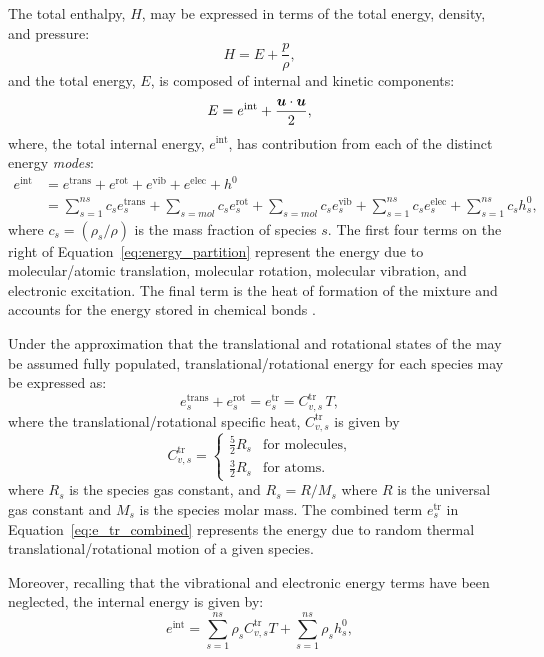 \documentclass[10pt]{article}
\newcommand{\bv}[1]{\ensuremath{\mbox{\boldmath$ #1 $}}}
\begin{document}
The total enthalpy, $H$, may be expressed in terms of the total energy, density, and pressure:
$$H = E + \dfrac{p}{\rho},$$
and the total energy, $E$, is composed of internal and kinetic components: $$E = e^{\text{int}} + \dfrac{\bv{u}\cdot\bv{u}}{2},$$
where, the total internal energy, $e^{\text{int}}$, has contribution from each of the distinct energy \emph{modes}:%
\begin{align}
 e^{\text{int}} &= e^{\text{trans}} + e^{\text{rot}} + e^{\text{vib}} + e^{\text{elec}} + h^0 \\
 &= \sum_{s=1}^{ns} c_s e^{\text{trans}}_s + \sum_{s=mol} c_s e^{\text{rot}}_s + \sum_{s=mol} c_s e^{\text{vib}}_s + \sum_{s=1}^{ns} c_s e^{\text{elec}}_s + \sum_{s=1}^{ns} c_s h^0_s ,
\label{eq:energy_partition}
\end{align}
where $c_s=\left(\rho_s/\rho\right)$ is the mass fraction of species $s$. 
The first four terms on the right of Equation~\eqref{eq:energy_partition} represent the energy due to molecular/atomic translation, molecular rotation, molecular vibration, and electronic excitation. The final term is the heat of formation of the mixture and accounts for the energy stored in chemical bonds \citep{Ait1996,Kirk2009}.

Under the approximation that the translational and rotational states of the may be assumed fully populated, translational/rotational energy for each species may be expressed as:
\begin{equation}
 \label{eq:e_tr_combined}
 e^{\text{trans}}_s + e^{\text{rot}}_s = e^{\text{tr}}_s = C^{\text{tr}}_{v,s}\, T ,
\end{equation}
where the translational/rotational specific heat, $C^{\text{tr}}_{v,s}$ is given by
\begin{equation}
 C^{\text{tr}}_{v,s} =
 \begin{cases}
 \frac{5}{2} R_s & \text{for molecules}, \\
 \frac{3}{2} R_s & \text{for atoms.}
 \end{cases}
\end{equation}
where $R_s$ is the species gas constant, and $R_s = R/M_s$ where $R$ is the universal gas constant and $M_s$ is the species molar mass. The combined term $e^{\text{tr}}_s$ in Equation~\eqref{eq:e_tr_combined} represents the energy due to random thermal translational/rotational motion of a given species.

Moreover, recalling that the vibrational and electronic energy terms have been neglected, the internal energy is given by:
\begin{equation}
 \label{eq:rE-T-Tv-relationship}
 e^{\text{int}} = \sum_{s=1}^{ns} \rho_s C^{\text{tr}}_{v,s} T + \sum_{s=1}^{ns} \rho_s h^0_s ,
\end{equation}
\end{document}
